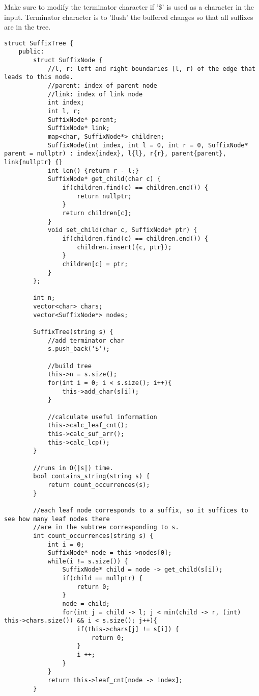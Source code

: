 \documentclass[8pt, headheight=10pt, a4paper]{article}
\begin{document}
\begin{multicols*}{3}
Make sure to modify the terminator character if '\$' is used as a character in the input. Terminator character is to 'flush' the buffered changes so that all suffixes are in the tree. 
\begin{lstlisting}
struct SuffixTree {
    public:
        struct SuffixNode {
            //l, r: left and right boundaries [l, r) of the edge that leads to this node.   
            //parent: index of parent node
            //link: index of link node
            int index;
            int l, r;
            SuffixNode* parent;
            SuffixNode* link;
            map<char, SuffixNode*> children;
            SuffixNode(int index, int l = 0, int r = 0, SuffixNode* parent = nullptr) : index{index}, l{l}, r{r}, parent{parent}, link{nullptr} {}
            int len() {return r - l;}
            SuffixNode* get_child(char c) {
                if(children.find(c) == children.end()) {
                    return nullptr;
                }
                return children[c];
            }
            void set_child(char c, SuffixNode* ptr) {
                if(children.find(c) == children.end()) {
                    children.insert({c, ptr});
                }
                children[c] = ptr;
            }
        };
        
        int n;
        vector<char> chars;
        vector<SuffixNode*> nodes;

        SuffixTree(string s) {
            //add terminator char
            s.push_back('$');

            //build tree
            this->n = s.size();
            for(int i = 0; i < s.size(); i++){
                this->add_char(s[i]);
            }

            //calculate useful information
            this->calc_leaf_cnt();
            this->calc_suf_arr();
            this->calc_lcp();
        }

        //runs in O(|s|) time. 
        bool contains_string(string s) {
            return count_occurrences(s);
        }

        //each leaf node corresponds to a suffix, so it suffices to see how many leaf nodes there
        //are in the subtree corresponding to s. 
        int count_occurrences(string s) {
            int i = 0;
            SuffixNode* node = this->nodes[0];
            while(i != s.size()) {
                SuffixNode* child = node -> get_child(s[i]);
                if(child == nullptr) {
                    return 0;
                }
                node = child;
                for(int j = child -> l; j < min(child -> r, (int) this->chars.size()) && i < s.size(); j++){
                    if(this->chars[j] != s[i]) {
                        return 0;
                    }
                    i ++;
                }
            }
            return this->leaf_cnt[node -> index];
        }
        

\end{lstlisting}
\end{multicols*}
\end{document}
